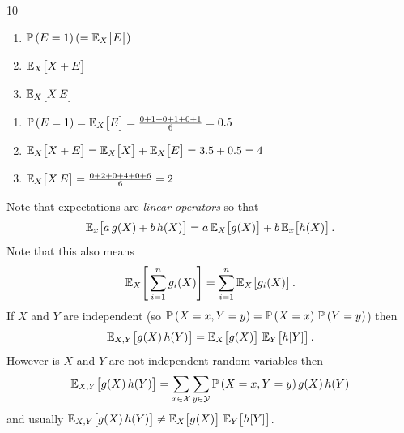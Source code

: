 \documentclass{sotonExamBoxes}    %
\begin{document}
\begin{question}{10}
\begin{qparts}
{\begin{enumerate}
      \item $\Prob{E=1} (= \av[X]{E})$
      \item $\av[X]{X + E}$
      \item $\av[X]{X\,E}$
      \end{enumerate}
    }{}
    \begin{answer}
      \begin{enumerate}
      \item $\Prob{E=1} = \av[X]{E} = \frac{0+1+0+1+0+1}{6} = 0.5$
      \item $\av[X]{X + E} = \av[X]{X} + \av[X]{E} = 3.5 + 0.5 = 4$
      \item $\av[X]{X\,E} = \frac{0 +2 + 0 +4 +0 +6}{6} = 2$
      \end{enumerate}
    \end{answer}
    \end{qparts}
\end{question}
\begin{answer}
  Note that expectations are \textit{linear operators} so that
  \begin{align*}
    \av[x]{a\,g(X) + b\,h(X)} = a\,\av[X]{g(X)} + b\,\av[x]{h(X)}.
  \end{align*}
  Note that this also means
  \begin{align*}
    \av[X]{\sum_{i=1}^n g_i(X)} = \sum_{i=1}^n \av[X]{g_i(X)}.
  \end{align*}
  If $X$ and $Y$ are independent (so $\Prob{X=x, Y=y}=
  \Prob{X=x}\,\Prob{Y=y}$) then
  \begin{align*}
    \av[X,Y]{g(X)\, h(Y)} = \av[X]{g(X)} \, \av[Y]{h[Y]}.
  \end{align*}
  However is $X$ and $Y$ are not independent random variables then
   \begin{align*}
    \av[X,Y]{g(X)\, h(Y)} = \sum_{x\in\mathcal{X}}
     \sum_{y\in\mathcal{Y}} \Prob{X=x,Y=y} g(X)\, h(Y)
   \end{align*}
   and usually $\av[X,Y]{g(X)\, h(Y)} \neq \av[X]{g(X)} \, \av[Y]{h[Y]}$.
\end{answer}
\end{document}
